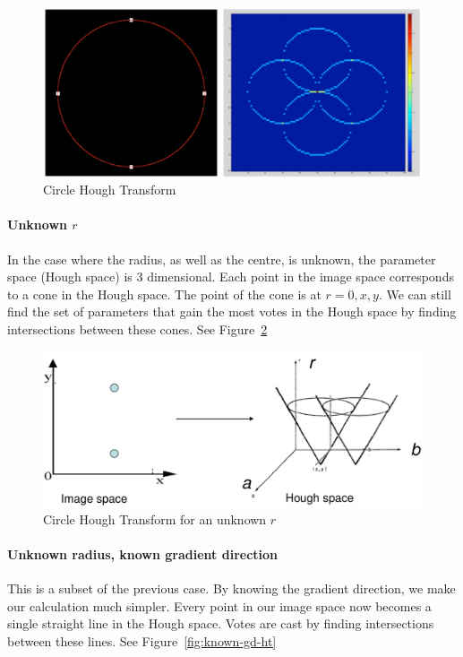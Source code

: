 \documentclass{article}
\begin{document}
\begin{figure}[ht]
  \centering
  \includegraphics[scale=0.3]{figures/l4-2.jpg}
  \caption{\label{fig:cht} Circle Hough Transform}
\end{figure}

\paragraph{Unknown $r$}
In the case where the radius, as well as the centre, is unknown, the parameter space (Hough space) is 3 dimensional. Each point in the image space corresponds to a cone in the Hough space. The point of the cone is at $r=0,x,y$. We can still find the set of parameters that gain the most votes in the Hough space by finding intersections between these cones. See Figure~\ref{fig:unknown-r-ht}

\begin{figure}[ht]
  \centering
  \includegraphics[scale=0.3]{figures/l4-3.png}
  \caption{\label{fig:unknown-r-ht} Circle Hough Transform for an unknown $r$ }
\end{figure}

\paragraph{Unknown radius, known gradient direction}

This is a subset of the previous case. By knowing the gradient direction, we make our calculation much simpler. Every point in our image space now becomes a single straight line in the Hough space. Votes are cast by finding intersections between these lines. See Figure~\ref{fig:known-gd-ht}
\end{document}
